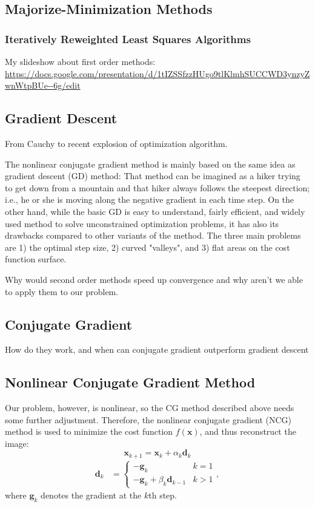 \iffalse

\subsection{Majorize-Minimization Methods}

\subsubsection{Iteratively Reweighted Least Squares Algorithms}

My slideshow about first order methods: \url{https://docs.google.com/presentation/d/1tIZSSfzzHUgo9tlKlmhSUCCWD3ynzyZwnWtpBUe--6g/edit}

\subsection{Gradient Descent}
From Cauchy to recent explosion of optimization algorithm.

The nonlinear conjugate gradient method is mainly based on the same idea as gradient descent (GD) method: That method can be imagined as a hiker trying to get down from a mountain and that hiker always follows the steepest direction; i.e., he or she is moving along the negative gradient in each time step. On the other hand, while the basic GD is easy to understand, fairly efficient, and widely used method to solve unconstrained optimization problems, it has also its drawbacks compared to other variants of the method. The three main problems are 1) the optimal step size, 2) curved "valleys", and 3) flat areas on the cost function surface. 

Why would second order methods speed up convergence and why aren't we able to apply them to our problem.

\subsection{Conjugate Gradient}
How do they work, and when can conjugate gradient outperform gradient descent

\subsection{Nonlinear Conjugate Gradient Method}
Our problem, however, is nonlinear, so the CG method described above needs some further adjustment. Therefore, the nonlinear conjugate gradient (NCG) method is used to minimize the cost function $f(\mathbf{x})$, and thus reconstruct the image:
$$\mathbf{x}_{k+1} = \mathbf{x}_k + \alpha_k \mathbf{d}_k$$
\begin{align*}
    \mathbf{d}_k &=
    \begin{cases}
    -\mathbf{g}_k & k = 1 \\
    -\mathbf{g}_k + \beta_k \mathbf{d}_{k-1} & k > 1
    \end{cases},
\end{align*}
where $\mathbf{g}_k$ denotes the gradient at the $k$th step.

